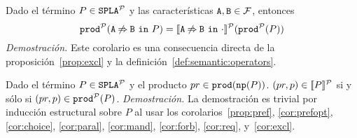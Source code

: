 \bprop\label{cor:excl}
  Dado el término $P\in\mathtt{SPLA{^{\cal P}}}$ y las características $\mathtt{A},\mathtt{B}\in{\cal F}$, entonces
  \begin{displaymath}
    \mathtt{prod}^{\cal P}(\mathtt{A}\mathbin{\not\Rightarrow}\mathtt{B}\ \mathtt{in}\ P)=[\![\mathtt{A}\mathbin{\not\Rightarrow}\mathtt{B}\ \mathtt{in}\ \cdot]\!]^{\cal P}(\mathtt{prod}^{\cal P}(P))
  \end{displaymath}
  \textit{Demostración.}
    Este corolario es una consecuencia directa de la proposición~\ref{prop:excl} y la definición~\ref{def:semantic:operators}.
\eprop

\bthm\label{prop:equivprob}
  Dado el término $P\in\mathtt{SPLA{^{\cal P}}}$ y el producto $pr\in\mathtt{prod}(\mathtt{np}(P))$. $(pr,p)\in[\![P]\!]^{\cal P}$ si y sólo si
  $(pr,p)\in\mathtt{prod}^{\cal P}(P)$.
  \textit{Demostración.}
    La demostración es trivial por inducción estructural sobre $P$
    al usar los corolarios~\ref{prop:pref}, \ref{cor:prefopt}, \ref{cor:choice},
    \ref{cor:paral},  \ref{cor:mand}, \ref{cor:forb}, \ref{cor:req}, y~\ref{cor:excl}.
\ethm


  

